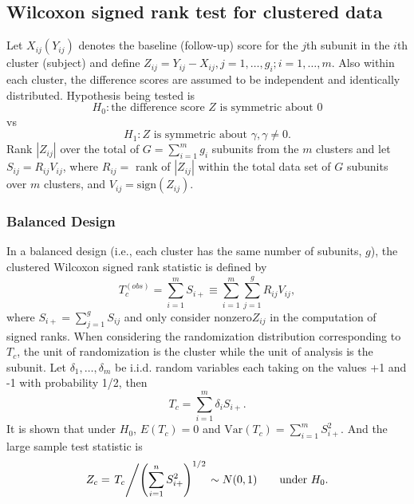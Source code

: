 \documentclass[article]{jss}
\begin{document}
\subsection{Wilcoxon signed rank test for clustered data}
Let $X_{ij} (Y_{ij})$ denotes the baseline (follow-up) score for the $j$th subunit in the $i$th cluster (subject) and define $Z_{ij} = Y_{ij} - X_{ij}, j = 1, \ldots,g_i; i = 1,\ldots,m$. Also within each cluster, the difference scores are assumed to be independent and identically distributed. Hypothesis being tested is
\begin{equation*}
H_0: \text{the difference score } Z \text{ is symmetric about 0}
\end{equation*}
vs
\begin{equation*}
H_1: Z \text{ is symmetric about }\gamma, \gamma \not = 0.
\end{equation*}
Rank $|Z_{ij}|$ over the total of $G = \sum_{i=1}^m g_i$ subunits from the $m$ clusters and let $S_{ij}=R_{ij}V_{ij}$, where $R_{ij} = $ rank of $|Z_{ij}|$ within the total data set of $G$ subunits over $m$ clusters, and $V_{ij} = \text{sign}(Z_{ij})$.
\subsubsection{Balanced Design} \label{bal1}
In a balanced design (i.e., each cluster has the same number of subunits, $g$), the clustered Wilcoxon signed rank statistic is defined by 
\begin{equation}
T_{c}^{(obs)} = \sum_{i=1}^mS_{i+} \equiv \sum^m_{i=1}\sum^g_{j=1}R_{ij}V_{ij},
\end{equation}
where $S_{i+} = \sum_{j=1}^gS_{ij}$ and only consider nonzero$Z_{ij}$ in the computation of signed ranks.
When considering the randomization distribution corresponding to $T_c$, the unit of randomization is the cluster while the unit of analysis is the subunit. Let $\delta_1, \ldots,\delta_m$ be i.i.d. random variables each taking on the values +1 and -1 with probability 1/2, then 
\begin{equation} \label{eq:tc}
T_c = \sum_{i=1}^m\delta_iS_{i+}.
\end{equation}
It is shown that under $H_0$, $E(T_c) = 0$ and $\text{Var}(T_c) = \sum^m_{i=1}S^2_{i+}$.
And the large sample test statistic is 
\begin{equation}
Z_c = \left. T_c \middle/ \left(\sum_{i=1}^nS^2_{i+}\right)^{1/2}\right. \sim N(0, 1)\qquad \text{under } H_0.
\end{equation}
\end{document}
